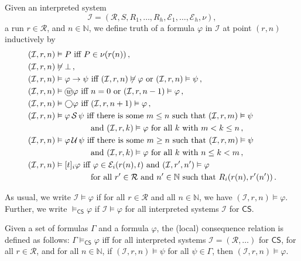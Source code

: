 \documentclass[envcountsect,envcountsame,oribibl,orivec]{llncs}
\newcommand*\circled[1]{\tikz[baseline=(char.base)]{
		\node[shape=circle,draw,inner sep=0.4pt] (char) {#1};}}
\newcommand{\lfalse}{\bot}
\newcommand{\limplies}{\rightarrow}
\newcommand{\lnext}{\bigcirc}
\newcommand{\luntil}{{\,\mathcal{U}\,}}
\newcommand{\lsince}{{\,\mathcal{S}\,}}
\newcommand{\wprevious}{\circled{\textit{w}}}
\newcommand{\jbox}[1]{\left[#1\right]\!}
\newcommand{\CS}{\textsf{CS}}
\newcommand{\numberofagents}{h}
\newcommand{\agent}{i}
\newcommand{\runs}{\mathcal{R}}
\newcommand{\system}{\mathcal{I}}
\newcommand{\evidence}{\mathcal{E}}
\newcommand{\valuation}{\nu}
\newcommand{\entails}{\vDash}
\newcommand{\N}{\mathbb{N}}
\renewcommand{\phi}{\varphi}
\begin{document}
\begin{definition}\label{def:truth conditions interpreted systems}
	Given an interpreted system 
	\[
	\system = (\runs, S, R_1,\ldots,R_\numberofagents, \evidence_1,\ldots,\evidence_\numberofagents, \valuation),
	\] 
	a run $r \in \runs$, and  $n \in \N$, we define truth of a formula $\phi$ in $\system$ at point $(r,n)$ inductively by 
	\begin{align*}
	(\system, r, n) &\entails P \text{ iff } P \in \valuation(r(n)) \, ,\\
	(\system, r, n) &\not\entails \lfalse \, ,\\
	(\system, r, n) &\entails \phi \limplies \psi \text{ iff } (\system, r, n) \not\entails \phi \text{ or } (\system, r, n) \entails \psi \, ,\\
	(\system, r, n) &\entails \wprevious \phi \text{ iff $n=0$ or } (\system, r, n-1) \entails \phi \, ,\\
	(\system, r, n) &\entails \lnext \phi \text{ iff } (\system, r, n+1) \entails \phi \, ,\\
	(\system, r, n) &\entails \phi \lsince \psi \text{ iff there is some } m \leq n \text{ such that } (\system, r, m) \entails \psi \\ & \qquad\qquad \text{ and } (\system, r, k) \entails \phi \text{ for all $k$ with } m < k \leq n \, ,\\
	(\system, r, n) &\entails \phi \luntil \psi \text{ iff there is some } m \geq n \text{ such that } (\system, r, m) \entails \psi \\ & \qquad\qquad \text{ and } (\system, r, k) \entails \phi \text{ for all $k$ with  } n \leq k < m \, ,\\    
	(\system, r, n) &\entails \jbox{t}_\agent \phi \text{ iff }  \phi \in \evidence_\agent(r(n),t)  \text { and } (\system, r^\prime, n^\prime) \entails \phi \\ &\qquad\qquad \text{ for all } r^\prime \in \runs \text{ and } n^\prime \in \N \text{ such that } R_\agent(r(n) , r^\prime(n^\prime)) \, .
	\end{align*}
	
	
	As usual, we write $\system \entails \phi$ if
	for all $r \in \runs$ and all $ n \in \N$, we have 
	$(\system, r, n) \entails \phi$.
	Further, we write $\entails_\CS \phi$ if $\system \entails \phi$ for all 
	interpreted systems $\system$ for $\CS$.
\end{definition}

\begin{definition}
 Given a set of formulas $\Gamma$ and a formula $\phi$, the (local) consequence relation is defined as follows: $\Gamma \models_\CS \phi$ iff for all 
 interpreted systems $\system = (\runs, \ldots)$ for $\CS$, for all $r \in \runs$, and for all $ n \in \N$, if $(\system, r, n) \entails \psi$ for all $\psi \in \Gamma$, then $(\system, r, n) \entails \phi$.
\end{definition}
\end{document}
